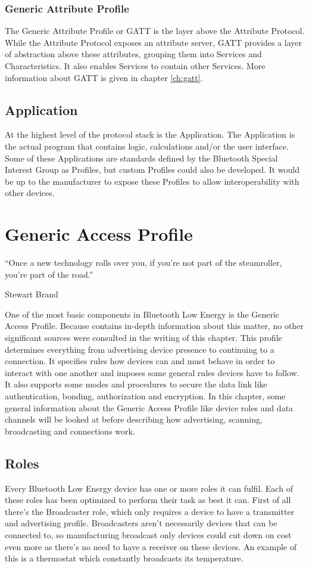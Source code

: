 \documentclass[pdftex,a4paper,12pt,twoside]{report}
\begin{document}
\subsection{Generic Attribute Profile}
\label{subsec:hostGATT}
The Generic Attribute Profile or GATT is the layer above the Attribute Protocol. While the Attribute Protocol exposes an attribute server, GATT provides a layer of abstraction above these attributes, grouping them into Services and Characteristics. It also enables Services to contain other Services. More information about GATT is given in chapter \ref{ch:gatt}.

\section{Application}
\label{sec:stackApplication}
At the highest level of the protocol stack is the Application. The Application is the actual program that contains logic, calculations and/or the user interface. Some of these Applications are standards defined by the Bluetooth Special Interest Group as Profiles, but custom Profiles could also be developed. It would be up to the manufacturer to expose these Profiles to allow interoperability with other devices.

\chapter{Generic Access Profile}
\label{ch:gap}
\epigraph{``Once a new technology rolls over you, if you’re not part of the steamroller, you’re part of the road.''}{Stewart Brand}
One of the most basic components in Bluetooth Low Energy is the Generic Access Profile. Because \cite{heydon2012bluetooth} contains in-depth information about this matter, no other significant sources were consulted in the writing of this chapter. This profile determines everything from advertising device presence to continuing to a connection. It specifies rules how devices can and must behave in order to interact with one another and imposes some general rules devices have to follow. It also supports some modes and procedures to secure the data link like authentication, bonding, authorization and encryption. In this chapter, some general information about the Generic Access Profile like device roles and data channels will be looked at before describing how advertising, scanning, broadcasting and connections work.

\newpage{}

\section{Roles}
\label{sec:roles}
Every Bluetooth Low Energy device has one or more roles it can fulfil. Each of these roles has been optimized to perform their task as best it can. First of all there's the Broadcaster role, which only requires a device to have a transmitter and advertising profile. Broadcasters aren't necessarily devices that can be connected to, so manufacturing broadcast only devices could cut down on cost even more as there's no need to have a receiver on these devices. An example of this is a thermostat which constantly broadcasts its temperature.
\end{document}
